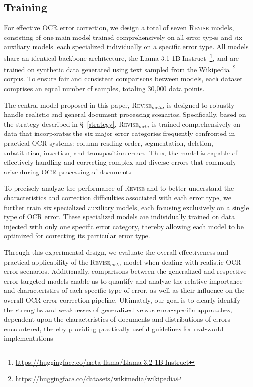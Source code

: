 \subsection{Training}

For effective OCR error correction, we design a total of seven \textsc{Revise} models, consisting of one main model trained comprehensively on all error types and six auxiliary models, each specialized individually on a specific error type. All models share an identical backbone architecture, the Llama-3.1-1B-Instruct~\footnote{\url{https://huggingface.co/meta-llama/Llama-3.2-1B-Instruct}}, and are trained on synthetic data generated using text sampled from the Wikipedia~\footnote{\url{https://huggingface.co/datasets/wikimedia/wikipedia}} corpus. To ensure fair and consistent comparisons between models, each dataset comprises an equal number of samples, totaling 30,000 data points.

The central model proposed in this paper, \textsc{Revise}$_{meta}$, is designed to robustly handle realistic and general document processing scenarios. Specifically, based on the strategy described in \S~\ref{strategy}, \textsc{Revise}$_{meta}$ is trained comprehensively on data that incorporates the six major error categories frequently confronted in practical OCR systems: column reading order, segmentation, deletion, substitution, insertion, and transposition errors. Thus, the model is capable of effectively handling and correcting complex and diverse errors that commonly arise during OCR processing of documents.

To precisely analyze the performance of \textsc{Revise} and to better understand the characteristics and correction difficulties associated with each error type, we further train six specialized auxiliary models, each focusing exclusively on a single type of OCR error. These specialized models are individually trained on data injected with only one specific error category, thereby allowing each model to be optimized for correcting its particular error type.

Through this experimental design, we evaluate the overall effectiveness and practical applicability of the \textsc{Revise}$_{meta}$ model when dealing with realistic OCR error scenarios. Additionally, comparisons between the generalized and respective error-targeted models enable us to quantify and analyze the relative importance and characteristics of each specific type of error, as well as their influence on the overall OCR error correction pipeline. Ultimately, our goal is to clearly identify the strengths and weaknesses of generalized versus error-specific approaches, dependent upon the characteristics of documents and distributions of errors encountered, thereby providing practically useful guidelines for real-world implementations.



